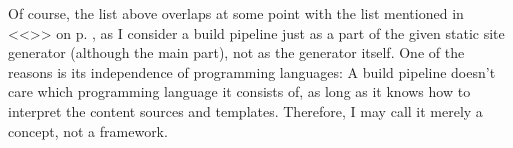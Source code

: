 Of course, the list above overlaps at some point with the list mentioned in <<\emph{}>> on p. \pageref{par:creatingcontent}, as I consider a build pipeline just as a part of the given static site generator (although the main part), not as the generator itself. One of the reasons is its independence of programming languages: A build pipeline doesn't care which programming language it consists of, as long as it knows how to interpret the content sources and templates. Therefore, I may call it merely a concept, not a framework.




\vspace{20pt}



\vspace{20pt}


